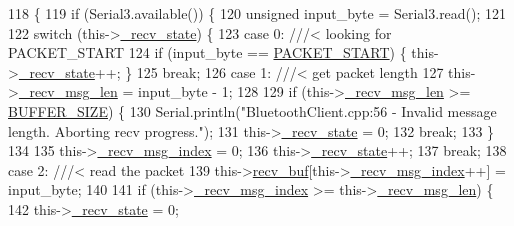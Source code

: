\begin{DoxyCode}
118                                \{
119     \textcolor{keywordflow}{if} (Serial3.available()) \{
120         \textcolor{keywordtype}{unsigned} input\_byte = Serial3.read();
121 
122         \textcolor{keywordflow}{switch} (this->\hyperlink{class_bluetooth_client_a84f2227913ec4eaf68fe3ccfaaf29d9e}{\_recv\_state}) \{
123             \textcolor{keywordflow}{case} 0: \textcolor{comment}{///< looking for PACKET\_START}
124 \textcolor{comment}{}                \textcolor{keywordflow}{if} (input\_byte == \hyperlink{class_bluetooth_client_a4a33990a75d3b22f329fa8fcab00ab03}{PACKET\_START}) \{ this->\hyperlink{class_bluetooth_client_a84f2227913ec4eaf68fe3ccfaaf29d9e}{\_recv\_state}++; \}
125                 \textcolor{keywordflow}{break};
126             \textcolor{keywordflow}{case} 1: \textcolor{comment}{///< get packet length}
127 \textcolor{comment}{}                this->\hyperlink{class_bluetooth_client_a30e47aa21808bd60b99cf5778e67c059}{\_recv\_msg\_len} = input\_byte - 1;
128 
129                 \textcolor{keywordflow}{if} (this->\hyperlink{class_bluetooth_client_a30e47aa21808bd60b99cf5778e67c059}{\_recv\_msg\_len} >= \hyperlink{class_bluetooth_client_a88edb272fc00fb3c65b9e95281cae00b}{BUFFER\_SIZE}) \{
130                     Serial.println(\textcolor{stringliteral}{"BluetoothClient.cpp:56 - Invalid message length. Aborting recv
       progress."});
131                     this->\hyperlink{class_bluetooth_client_a84f2227913ec4eaf68fe3ccfaaf29d9e}{\_recv\_state} = 0;
132                     \textcolor{keywordflow}{break};
133                 \}
134 
135                 this->\hyperlink{class_bluetooth_client_a0edb43a0aa23b2b4a9f5a1b94d568ed0}{\_recv\_msg\_index} = 0;
136                 this->\hyperlink{class_bluetooth_client_a84f2227913ec4eaf68fe3ccfaaf29d9e}{\_recv\_state}++;
137                 \textcolor{keywordflow}{break};
138             \textcolor{keywordflow}{case} 2: \textcolor{comment}{///< read the packet}
139 \textcolor{comment}{}                this->\hyperlink{class_bluetooth_client_a83675b45ddf8021663ecd6200a22b1cb}{recv\_buf}[this->\hyperlink{class_bluetooth_client_a0edb43a0aa23b2b4a9f5a1b94d568ed0}{\_recv\_msg\_index}++] = input\_byte;
140 
141                 \textcolor{keywordflow}{if} (this->\hyperlink{class_bluetooth_client_a0edb43a0aa23b2b4a9f5a1b94d568ed0}{\_recv\_msg\_index} >= this->\hyperlink{class_bluetooth_client_a30e47aa21808bd60b99cf5778e67c059}{\_recv\_msg\_len}) \{
142                     this->\hyperlink{class_bluetooth_client_a84f2227913ec4eaf68fe3ccfaaf29d9e}{\_recv\_state} = 0;

\end{DoxyCode}
